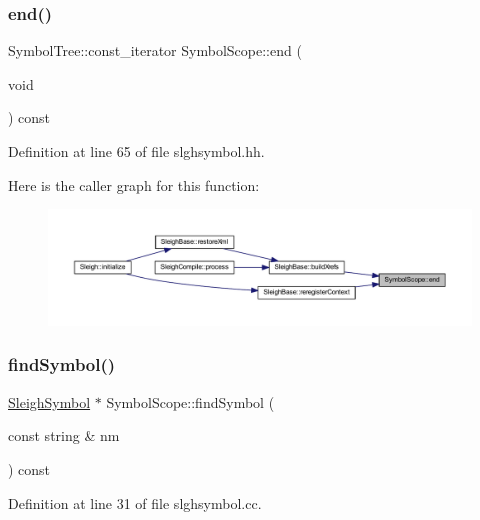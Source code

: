 \subsubsection{\texorpdfstring{end()}{end()}}
{\footnotesize\ttfamily Symbol\+Tree\+::const\+\_\+iterator Symbol\+Scope\+::end (\begin{DoxyParamCaption}\item[{void}]{ }\end{DoxyParamCaption}) const\hspace{0.3cm}{\ttfamily [inline]}}



Definition at line 65 of file slghsymbol.\+hh.

Here is the caller graph for this function\+:
\nopagebreak
\begin{figure}[H]
\begin{center}
\leavevmode
\includegraphics[width=350pt]{class_symbol_scope_afb18a2563283ed5990eefca5fdaeae94_icgraph}
\end{center}
\end{figure}
\mbox{\label{class_symbol_scope_a454ef20ad6ce080c875a6342f4272c1b}} 
\subsubsection{\texorpdfstring{findSymbol()}{findSymbol()}}
{\footnotesize\ttfamily \mbox{\hyperlink{class_sleigh_symbol}{Sleigh\+Symbol}} $\ast$ Symbol\+Scope\+::find\+Symbol (\begin{DoxyParamCaption}\item[{const string \&}]{nm }\end{DoxyParamCaption}) const}



Definition at line 31 of file slghsymbol.\+cc.

\mbox{\label{class_symbol_scope_ab78b27aa1cb0b43da992d9317db30b79}} 
